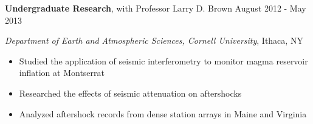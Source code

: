 
\vspace{7pt}

\textbf{Undergraduate Research}, with Professor Larry D. Brown \hfill August 2012 - May 2013

\textit{Department of Earth and Atmospheric Sciences, Cornell University}, Ithaca, NY

\begin{itemize}
    \item Studied the application of seismic interferometry to monitor magma reservoir inflation at Montserrat
    \item Researched the effects of seismic attenuation on aftershocks
    \item Analyzed aftershock records from dense station arrays in Maine and Virginia
\end{itemize}
